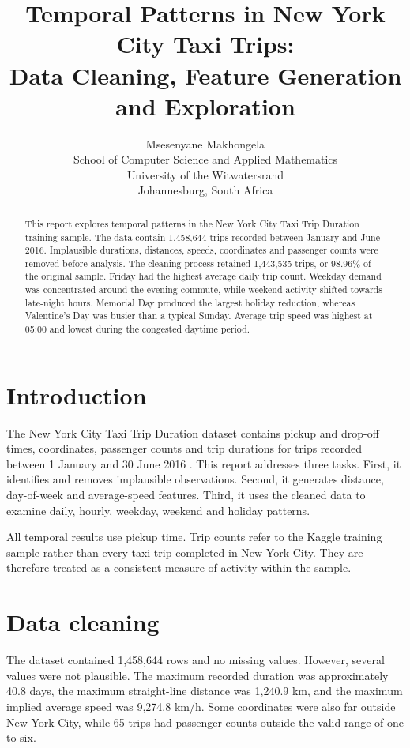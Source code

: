 \documentclass{article}
\title{Temporal Patterns in New York City Taxi Trips:\\
Data Cleaning, Feature Generation and Exploration}
\author{%
  Msesenyane Makhongela \\
  School of Computer Science and Applied Mathematics \\
  University of the Witwatersrand \\
  Johannesburg, South Africa
}
\begin{document}
\maketitle

\begin{abstract}
This report explores temporal patterns in the New York City Taxi Trip Duration
training sample. The data contain 1,458,644 trips recorded between January and
June 2016. Implausible durations, distances, speeds, coordinates and passenger
counts were removed before analysis. The cleaning process retained 1,443,535
trips, or 98.96\% of the original sample. Friday had the highest average daily
trip count. Weekday demand was concentrated around the evening commute, while
weekend activity shifted towards late-night hours. Memorial Day produced the
largest holiday reduction, whereas Valentine's Day was busier than a typical
Sunday. Average trip speed was highest at 05:00 and lowest during the congested
daytime period.
\end{abstract}

\section{Introduction}

The New York City Taxi Trip Duration dataset contains pickup and drop-off
times, coordinates, passenger counts and trip durations for trips recorded
between 1 January and 30 June 2016 \cite{nyctaxi}. This report addresses three
tasks. First, it identifies and removes implausible observations. Second, it
generates distance, day-of-week and average-speed features. Third, it uses the
cleaned data to examine daily, hourly, weekday, weekend and holiday patterns.

All temporal results use pickup time. Trip counts refer to the Kaggle training
sample rather than every taxi trip completed in New York City. They are
therefore treated as a consistent measure of activity within the sample.

\section{Data cleaning}

The dataset contained 1,458,644 rows and no missing values. However, several
values were not plausible. The maximum recorded duration was approximately
40.8 days, the maximum straight-line distance was 1,240.9 km, and the maximum
implied average speed was 9,274.8 km/h. Some coordinates were also far outside
New York City, while 65 trips had passenger counts outside the valid range of
one to six.
\end{document}
